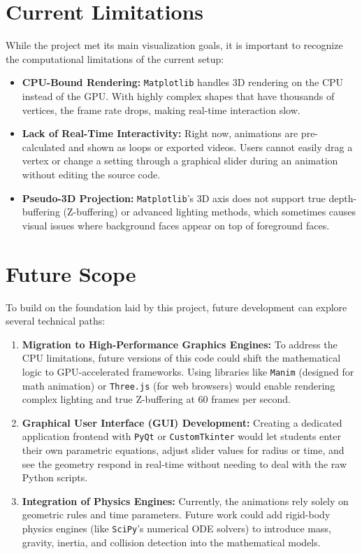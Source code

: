 \documentclass[12pt, a4paper]{report}
\begin{document}
\section{Current Limitations}
While the project met its main visualization goals, it is important to recognize the computational limitations of the current setup:
\begin{itemize}
    \item \textbf{CPU-Bound Rendering:} \texttt{Matplotlib} handles 3D rendering on the CPU instead of the GPU. With highly complex shapes that have thousands of vertices, the frame rate drops, making real-time interaction slow.
    \item \textbf{Lack of Real-Time Interactivity:} Right now, animations are pre-calculated and shown as loops or exported videos. Users cannot easily drag a vertex or change a setting through a graphical slider during an animation without editing the source code.
    \item \textbf{Pseudo-3D Projection:} \texttt{Matplotlib}'s 3D axis does not support true depth-buffering (Z-buffering) or advanced lighting methods, which sometimes causes visual issues where background faces appear on top of foreground faces.
\end{itemize}

\section{Future Scope}
To build on the foundation laid by this project, future development can explore several technical paths:

\begin{enumerate}
    \item \textbf{Migration to High-Performance Graphics Engines:} 
    To address the CPU limitations, future versions of this code could shift the mathematical logic to GPU-accelerated frameworks. Using libraries like \texttt{Manim} (designed for math animation) or \texttt{Three.js} (for web browsers) would enable rendering complex lighting and true Z-buffering at 60 frames per second.
    
    \item \textbf{Graphical User Interface (GUI) Development:}
    Creating a dedicated application frontend with \texttt{PyQt} or \texttt{CustomTkinter} would let students enter their own parametric equations, adjust slider values for radius or time, and see the geometry respond in real-time without needing to deal with the raw Python scripts.
    
    \item \textbf{Integration of Physics Engines:}
    Currently, the animations rely solely on geometric rules and time parameters. Future work could add rigid-body physics engines (like \texttt{SciPy}'s numerical ODE solvers) to introduce mass, gravity, inertia, and collision detection into the mathematical models.
\end{enumerate}
\end{document}
